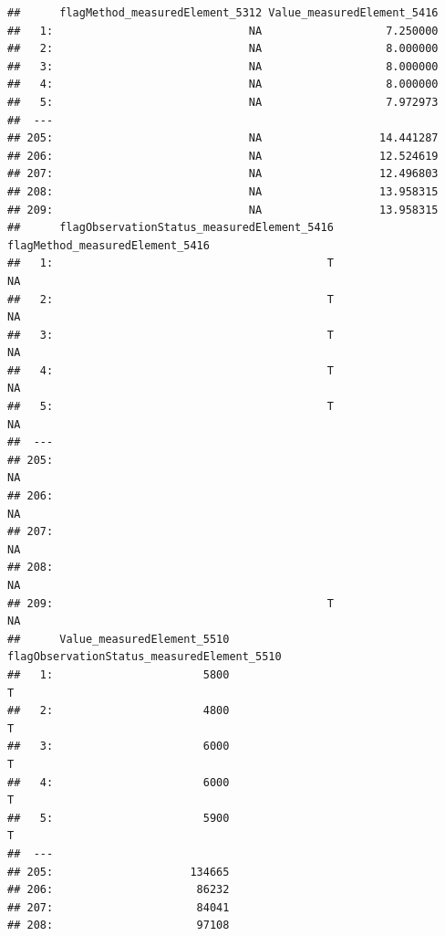 \documentclass[nojss]{jss}
\begin{document}
\begin{knitrout}
\begin{kframe}
\begin{verbatim}
##      flagMethod_measuredElement_5312 Value_measuredElement_5416
##   1:                              NA                   7.250000
##   2:                              NA                   8.000000
##   3:                              NA                   8.000000
##   4:                              NA                   8.000000
##   5:                              NA                   7.972973
##  ---                                                           
## 205:                              NA                  14.441287
## 206:                              NA                  12.524619
## 207:                              NA                  12.496803
## 208:                              NA                  13.958315
## 209:                              NA                  13.958315
##      flagObservationStatus_measuredElement_5416 flagMethod_measuredElement_5416
##   1:                                          T                              NA
##   2:                                          T                              NA
##   3:                                          T                              NA
##   4:                                          T                              NA
##   5:                                          T                              NA
##  ---                                                                           
## 205:                                                                         NA
## 206:                                                                         NA
## 207:                                                                         NA
## 208:                                                                         NA
## 209:                                          T                              NA
##      Value_measuredElement_5510 flagObservationStatus_measuredElement_5510
##   1:                       5800                                          T
##   2:                       4800                                          T
##   3:                       6000                                          T
##   4:                       6000                                          T
##   5:                       5900                                          T
##  ---                                                                      
## 205:                     134665                                           
## 206:                      86232                                           
## 207:                      84041                                           
## 208:                      97108                                           

\end{verbatim}
\end{kframe}
\end{knitrout}
\end{document}
